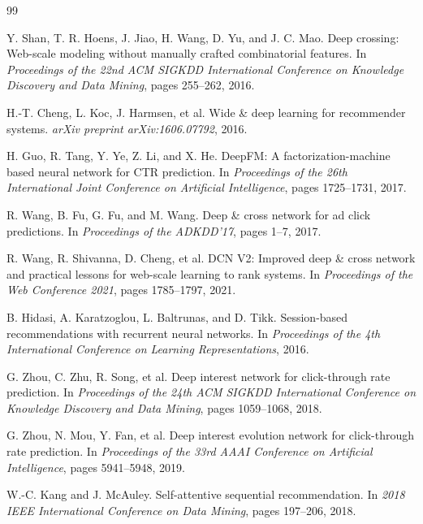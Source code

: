 \documentclass{article}
\begin{document}

\begin{thebibliography}{99}

Y. Shan, T. R. Hoens, J. Jiao, H. Wang, D. Yu, and J. C. Mao.
\newblock Deep crossing: Web-scale modeling without manually crafted combinatorial features.
\newblock In \emph{Proceedings of the 22nd ACM SIGKDD International Conference on Knowledge Discovery and Data Mining}, pages 255--262, 2016.

H.-T. Cheng, L. Koc, J. Harmsen, et al.
\newblock Wide \& deep learning for recommender systems.
\newblock \emph{arXiv preprint arXiv:1606.07792}, 2016.

H. Guo, R. Tang, Y. Ye, Z. Li, and X. He.
\newblock DeepFM: A factorization-machine based neural network for CTR prediction.
\newblock In \emph{Proceedings of the 26th International Joint Conference on Artificial Intelligence}, pages 1725--1731, 2017.

R. Wang, B. Fu, G. Fu, and M. Wang.
\newblock Deep \& cross network for ad click predictions.
\newblock In \emph{Proceedings of the ADKDD'17}, pages 1--7, 2017.

R. Wang, R. Shivanna, D. Cheng, et al.
\newblock DCN V2: Improved deep \& cross network and practical lessons for web-scale learning to rank systems.
\newblock In \emph{Proceedings of the Web Conference 2021}, pages 1785--1797, 2021.

B. Hidasi, A. Karatzoglou, L. Baltrunas, and D. Tikk.
\newblock Session-based recommendations with recurrent neural networks.
\newblock In \emph{Proceedings of the 4th International Conference on Learning Representations}, 2016.

G. Zhou, C. Zhu, R. Song, et al.
\newblock Deep interest network for click-through rate prediction.
\newblock In \emph{Proceedings of the 24th ACM SIGKDD International Conference on Knowledge Discovery and Data Mining}, pages 1059--1068, 2018.

G. Zhou, N. Mou, Y. Fan, et al.
\newblock Deep interest evolution network for click-through rate prediction.
\newblock In \emph{Proceedings of the 33rd AAAI Conference on Artificial Intelligence}, pages 5941--5948, 2019.

W.-C. Kang and J. McAuley.
\newblock Self-attentive sequential recommendation.
\newblock In \emph{2018 IEEE International Conference on Data Mining}, pages 197--206, 2018.


\end{thebibliography}
\end{document}
